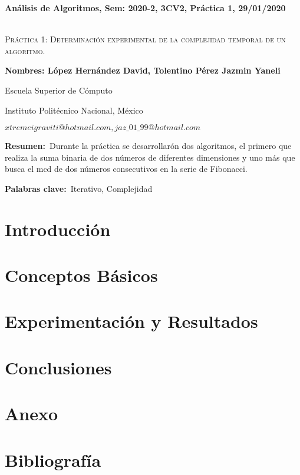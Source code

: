 \documentclass[12pt,twoside]{article}
\date{}
\begin{document}
	\centerline{\bf An\'alisis de Algoritmos, Sem: 2020-2, 3CV2, Pr\'actica 1, 29/01/2020}
	\begin{center}
		\Large{\textsc{\\ Pr\'actica 1: Determinaci\'on experimental de la complejidad temporal de un algoritmo.}}
	\end{center}
	\centerline{}
	\centerline{\bf {Nombres: L\'opez Hern\'andez David, Tolentino P\'erez Jazmin Yaneli }}
    \centerline{}
	\centerline{Escuela Superior de C\'omputo}
	\centerline{Instituto Polit\'ecnico Nacional, M\'exico}
	\centerline{$xtremeigraviti@hotmail.com ,  jaz\_01\_99@hotmail.com$}
    \centerline{}
	\textbf{Resumen:}\ Durante la práctica se desarrollarón dos algoritmos, el primero que realiza la suma binaria de dos números de diferentes dimensiones y uno más que busca el mcd de dos números consecutivos en la serie de Fibonacci. \\ 
	\centerline{}
	\textbf{Palabras clave:}\ Iterativo, Complejidad
	\section{Introducci\'on}
	
	\section{Conceptos B\'asicos}
	
	\section{Experimentaci\'on y Resultados}
	
	\section{Conclusiones}
	
	\section{Anexo}
	
	\section{Bibliograf\'ia}
	
\end{document}
